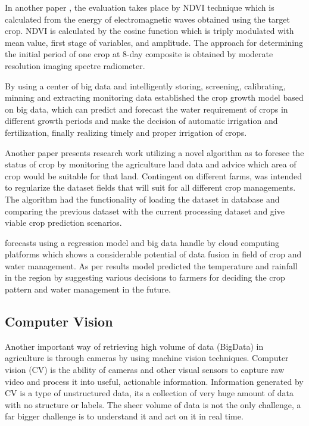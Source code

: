 \documentclass[review]{elsarticle}
\begin{document}
    In another paper \cite{Suwantong_2016}, the evaluation takes place by NDVI technique which is calculated from the energy of electromagnetic waves obtained using the target crop. NDVI is calculated by the cosine function which is triply modulated with mean value, first stage of variables, and amplitude. The approach for determining the initial period of one crop at 8-day composite is obtained by moderate resolution imaging spectre radiometer.

    By using a center of big data and intelligently storing, screening, calibrating, minning and extracting monitoring data \cite{Zhang_2017} established the crop growth model based on big data, which can predict and forecast the water requirement of crops in different growth periods and make the decision of automatic irrigation and fertilization, finally realizing timely and proper irrigation of crops.

    Another paper \cite{Sahu_2018} presents research work utilizing a novel algorithm as to foresee the status of crop by monitoring the agriculture land data and advice which area of crop would be suitable for that land. Contingent on different farms, was intended to regularize the dataset fields that will suit for all different crop managements. The algorithm had the functionality of loading the dataset in database and comparing the previous dataset with the current processing dataset and give viable crop prediction scenarios.

    \cite{Bendre_2015} forecasts using a regression model and big data handle by cloud computing platforms which shows a considerable potential of data fusion in field of crop and water management. As per results model predicted the temperature and rainfall in the region by suggesting various decisions to farmers for deciding the crop pattern and water management in the future.

    \subsection{Computer Vision}
    Another important way of retrieving high volume of data (BigData) in agriculture is through cameras by using machine vision techniques. Computer vision (CV) is the ability of cameras and other visual sensors to capture raw video and process it into useful, actionable information. Information generated by CV is a type of unstructured data, its a collection of very huge amount of data with no structure or labels. The sheer volume of data is not the only challenge, a far bigger challenge is to understand it and act on it in real time.
\end{document}
